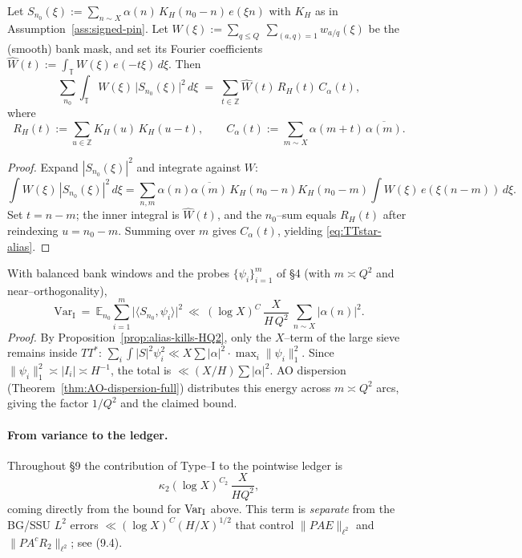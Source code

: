 \begin{lemma}\label{lem:TTstar-alias}
Let $S_{n_0}(\xi):=\sum_{n\sim X}\alpha(n)\,K_H(n_0-n)\,e(\xi n)$ with $K_H$ as in Assumption~\ref{ass:signed-pin}.
Let $W(\xi):=\sum_{q\le Q}\ \sum_{(a,q)=1} w_{a/q}(\xi)$ be the (smooth) bank mask, and set its Fourier coefficients
$\widehat W(t):=\int_{\mathbb T}W(\xi)\,e(-t\xi)\,d\xi$.
Then
\begin{equation}\label{eq:TTstar-alias}
\sum_{n_0}\int_{\mathbb T} W(\xi)\,\big|S_{n_0}(\xi)\big|^2\,d\xi
\;=\;
\sum_{t\in\mathbb Z}\widehat W(t)\,R_H(t)\,C_\alpha(t),
\end{equation}
where 
\[
R_H(t):=\sum_{u\in\mathbb Z} K_H(u)\,K_H(u-t),\qquad
C_\alpha(t):=\sum_{m\sim X}\alpha(m+t)\,\overline{\alpha(m)}.
\]
\end{lemma}

\begin{proof}
Expand $|S_{n_0}(\xi)|^2$ and integrate against $W$:
\[
\int W(\xi)\,|S_{n_0}(\xi)|^2\,d\xi
=\sum_{n,m}\alpha(n)\overline{\alpha(m)}\,K_H(n_0-n)K_H(n_0-m)\int W(\xi)\,e(\xi(n-m))\,d\xi.
\]
Set $t=n-m$; the inner integral is $\widehat W(t)$, and the $n_0$–sum equals $R_H(t)$ after reindexing $u=n_0-m$.
Summing over $m$ gives $C_\alpha(t)$, yielding \eqref{eq:TTstar-alias}.
\end{proof}

\begin{corollary}\label{cor:typeI-final}
With balanced bank windows and the probes $\{\psi_i\}_{i=1}^{m}$ of §4 (with $m\asymp Q^2$ and near--orthogonality),
\[
\mathrm{Var}_{\mathrm I}
\ =\ \mathbb E_{n_0}\sum_{i=1}^{m} \big|\langle S_{n_0},\psi_i\rangle\big|^2
\ \ll\ (\log X)^C\,\frac{X}{H\,Q^2}\ \sum_{n\sim X}|\alpha(n)|^2.
\]
\emph{Proof.} By Proposition~\ref{prop:alias-kills-HQ2}, only the $X$–term of the large sieve remains inside $TT^\ast$:
\(
\sum_{i}\int |S|^2 \psi_i^2 \ll X \sum|\alpha|^2 \cdot \max_i\|\psi_i\|_1^2
\).
Since $\|\psi_i\|_1^2\asymp |I_i|\asymp H^{-1}$, the total is $\ll (X/H)\sum|\alpha|^2$.
AO dispersion (Theorem~\ref{thm:AO-dispersion-full}) distributes this energy across $m\asymp Q^2$ arcs, giving the factor $1/Q^2$ and the claimed bound.
\end{corollary}

\paragraph{From variance to the ledger.}
Throughout §9 the contribution of Type--I to the pointwise ledger is
\[
\kappa_2 (\log X)^{C_2}\,\frac{X}{H Q^2},
\]
coming directly from the bound for \(\operatorname{Var}_{\mathrm{I}}\) above. This term is \emph{separate} from the BG/SSU \(L^2\) errors \(\ll (\log X)^{C}(H/X)^{1/2}\) that control \(\|PAE\|_{\ell^2}\) and \(\|PA^c R_2\|_{\ell^2}\); see (9.4).


